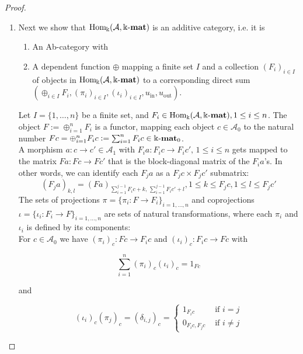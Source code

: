 \begin{proof}
\begin{enumerate}
\item Next we show that $\mathrm{Hom_{\Bbbk}}(\mathcal{A},\Bbbk\textnormal{-}\mathbf{mat})$ is an additive category, i.e. it is
\begin{enumerate}
\renewcommand{\labelenumii}{(\roman{enumii})}
\item An Ab-category with
\item A dependent function $\oplus$ mapping a finite set $I$ and a collection $(F_{i})_{i\in I}$ of objects in $\mathrm{Hom_{\Bbbk}}(\mathcal{A},\Bbbk\textnormal{-}\mathbf{mat})$
to a corresponding direct sum $( \oplus_{i\in I} F_{i}, (\pi_{i})_{i\in I}, (\iota_{i})_{i\in I}, u_{\mathrm{in}}, u_{\mathrm{out}} )$.
\end{enumerate}
\begin{subproof}[Proof of (ii)]
Let $I = \{1,\dots,n\}$ be a finite set, and $F_{i} \in \mathrm{Hom_{\Bbbk}}(\mathcal{A},\Bbbk\textnormal{-}\mathbf{mat}), 1\leq i\leq n$. The object $F := \oplus_{i=1}^{n} F_{i}$ is a functor, mapping
each object $c \in \mathcal{A}_{0}$ to the natural number $Fc = \oplus_{i=1}^{n} F_{i}c := \sum_{i=1}^{n} F_{i}c \in \Bbbk\textnormal{-}\mathbf{mat}_{0}$.\\
A morphism $a : c \rightarrow c' \in \mathcal{A}_{1}$ with $F_{i} a : F_{i} c \rightarrow F_{i} c', \, 1\leq i\leq n$ gets mapped to the matrix 
$F a : Fc \rightarrow Fc'$ that is the block-diagonal matrix of the $F_{i}a$'s.
In other words, we can identify each $F_{j}a$ as a $F_{j} c \times F_{j} c'$ submatrix:
\[
\left(F_{j}a\right)_{k,l} = \left(F a\right)_{\sum_{i=1}^{j-1} F_{i}c + k,\,\sum_{i=1}^{j-1} F_{i}c' + l},
1 \leq k \leq F_{j}c, 1 \leq l \leq F_{j}c'
\]
The sets of projections $\pi = \{ \pi_{i} : F \rightarrow F_{i} \}_{i = 1,\dots,n}$ and coprojections
$\iota = \{ \iota_{i} : F_{i} \rightarrow F \}_{i = 1,\dots,n}$ are sets of natural transformations,
where each $\pi_{i}$ and $\iota_{i}$ is defined by its components:\\
For $c \in \mathcal{A}_{0}$ we have $(\pi_{i})_{c} : Fc \rightarrow F_{i}c$ and $(\iota_{i})_{c} : F_{i}c \rightarrow Fc$ with\\
\begin{minipage}{.35\textwidth}
\[
\sum_{i=1}^{n} (\pi_{i})_{c} (\iota_{i})_{c} = 1_{Fc}
\]
\end{minipage}
\begin{minipage}{.1\textwidth}
and
\end{minipage}
\begin{minipage}{.55\textwidth}
\[
(\iota_{i})_{c}(\pi_{j})_{c} = (\delta_{i,j})_{c} = \begin{cases}
1_{F_{i}c} & \text{ if } i = j \\
0_{F_{i}c, F_{j}c} & \text{ if } i \neq j
\end{cases}
\]
\end{minipage}


\end{subproof}
\end{enumerate}
\end{proof}

